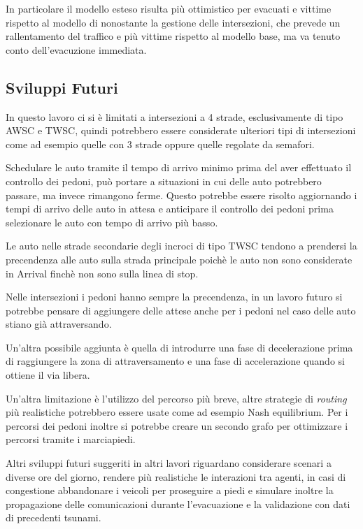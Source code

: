 In particolare il modello esteso risulta più ottimistico per evacuati e vittime rispetto al modello di \textcite{wang2021novel} nonostante la gestione delle intersezioni,
che prevede un rallentamento del traffico e più vittime rispetto al modello base, ma va tenuto conto dell'evacuzione immediata.

\subsection{Sviluppi Futuri}
In questo lavoro ci si è limitati a intersezioni a 4 strade, esclusivamente di tipo AWSC e TWSC, quindi potrebbero essere considerate
ulteriori tipi di intersezioni come ad esempio quelle con 3 strade oppure quelle regolate da semafori.

Schedulare le auto tramite il tempo di arrivo minimo prima del aver effettuato il controllo dei pedoni,
può portare a situazioni in cui delle auto potrebbero passare, ma invece rimangono ferme.
Questo potrebbe essere risolto aggiornando i tempi di arrivo delle auto in attesa e anticipare il controllo dei pedoni prima
selezionare le auto con tempo di arrivo più basso.

Le auto nelle strade secondarie degli incroci di tipo TWSC tendono a prendersi la precendenza alle auto sulla strada principale 
poichè le auto non sono considerate in Arrival finchè non sono sulla linea di stop.

Nelle intersezioni i pedoni hanno sempre la precendenza, in un lavoro futuro si potrebbe pensare di aggiungere delle attese anche per i pedoni
nel caso delle auto stiano già attraversando.

Un'altra possibile aggiunta è quella di introdurre una fase di decelerazione prima di raggiungere la zona di attraversamento e una fase
di accelerazione quando si ottiene il via libera.

Un'altra limitazione è l'utilizzo del percorso più breve, altre strategie di \textit{routing} più realistiche potrebbero essere usate come ad esempio Nash equilibrium.
Per i percorsi dei pedoni inoltre si potrebbe creare un secondo grafo per ottimizzare i percorsi tramite i marciapiedi.

Altri sviluppi futuri suggeriti in altri lavori riguardano considerare scenari a diverse ore del giorno, rendere 
più realistiche le interazioni tra agenti, in casi di congestione abbandonare i veicoli per proseguire a piedi e 
simulare inoltre la propagazione delle comunicazioni durante l'evacuazione e la validazione con dati di precedenti tsunami.
